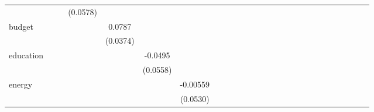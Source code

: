 \begin{tabular}{l*{25}{c}}
                    &            &            &    (0.0578)&            &            &            &            &            &            &            &            &            &            &            &            &            &            &            &            &            &            &            &            &            &            \\
budget              &            &            &            &      0.0787&            &            &            &            &            &            &            &            &            &            &            &            &            &            &            &            &            &            &            &            &            \\
                    &            &            &            &    (0.0374)&            &            &            &            &            &            &            &            &            &            &            &            &            &            &            &            &            &            &            &            &            \\
education           &            &            &            &            &     -0.0495&            &            &            &            &            &            &            &            &            &            &            &            &            &            &            &            &            &            &            &            \\
                    &            &            &            &            &    (0.0558)&            &            &            &            &            &            &            &            &            &            &            &            &            &            &            &            &            &            &            &            \\
energy              &            &            &            &            &            &    -0.00559&            &            &            &            &            &            &            &            &            &            &            &            &            &            &            &            &            &            &            \\
                    &            &            &            &            &            &    (0.0530)&            &            &            &            &            &            &            &            &            &            &            &            &            &            &            &            &            &            &            \\

\end{tabular}
